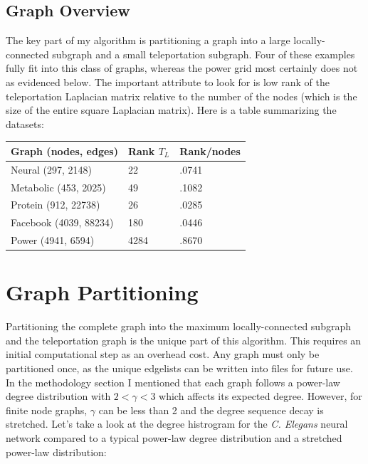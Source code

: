 \documentclass{article}
\begin{document}
\subsection{Graph Overview}
The key part of my algorithm is partitioning a graph into a large locally-connected subgraph and a small teleportation subgraph. Four of these examples fully fit into this class of graphs, whereas the power grid most certainly does not as evidenced below. The important attribute to look for is low rank of the teleportation Laplacian matrix relative to the number of the nodes (which is the size of the entire square Laplacian matrix). Here is a table summarizing the datasets:

\begin{spacing}{1}
\begin{center}
\renewcommand{\arraystretch}{1.5}
    \begin{tabular}{| l | l | l |}
    \hline
    Graph (nodes, edges) & Rank $T_L$ & Rank/nodes \\ \hline
    Neural (297, 2148) & 22 & .0741 \\ \hline
    Metabolic (453, 2025) & 49 & .1082 \\  \hline
    Protein (912, 22738) & 26 & .0285 \\ \hline
    Facebook (4039, 88234) & 180 & .0446 \\ \hline
    Power (4941, 6594) & 4284 & .8670 \\ 
    \hline
    \end{tabular}
\end{center}
\end{spacing}

\section{Graph Partitioning}
Partitioning the complete graph into the maximum locally-connected subgraph and the teleportation graph is the unique part of this algorithm. This requires an initial computational step as an overhead cost. Any graph must only be partitioned once, as the unique edgelists can be written into files for future use. In the methodology section I mentioned that each graph follows a power-law degree distribution with $2 < \gamma < 3$ which affects its expected degree. However, for finite node graphs, $\gamma$ can be less than 2 and the degree sequence decay is stretched. Let's take a look at the degree histrogram for the \textit{C. Elegans} neural network compared to a typical power-law degree distribution and a stretched power-law distribution:
\end{document}
